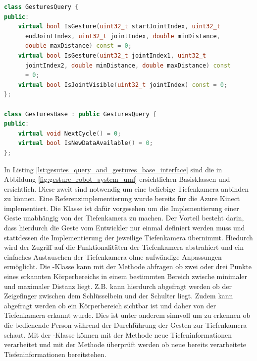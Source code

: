 \begin{lstlisting}[language=C++, caption={\quoteMark{GesturesQuery}- und \quoteMark{GesturesBase}-Programmierschnittstelle zur Anbindung eines Industrieroboters}, label={lst:gesutes_query_and_gestures_base_interface}]
class GesturesQuery {
public:
    virtual bool IsGesture(uint32_t startJointIndex, uint32_t
      endJointIndex, uint32_t jointIndex, double minDistance,
      double maxDistance) const = 0;
    virtual bool IsGesture(uint32_t jointIndex1, uint32_t
      jointIndex2, double minDistance, double maxDistance) const
      = 0;
    virtual bool IsJointVisible(uint32_t jointIndex) const = 0;
};

class GesturesBase : public GesturesQuery {
public:
    virtual void NextCycle() = 0;
    virtual bool IsNewDataAvailable() = 0;
};
\end{lstlisting}\leavevmode\newline\vspace{-1.0em}

In Listing \ref{lst:gesutes_query_and_gestures_base_interface} sind die in Abbildung \ref{fig:gesture_robot_system_uml} ersichtlichen Basisklassen  und  ersichtlich. Diese zweit sind notwendig um eine beliebige Tiefenkamera anbinden zu können. Eine Referenzimplementierung wurde bereits für die Azure Kinect implementiert. Die Klasse  ist dafür vorgesehen um die Implementierung einer Geste unabhängig von der Tiefenkamera zu machen. Der Vorteil besteht darin, dass hierdurch die Geste vom Entwickler nur einmal definiert werden muss und stattdessen die Implementierung der jeweilige Tiefenkamera übernimmt. Hiedurch wird der Zugriff auf die Funktionalitäten der Tiefenkamera abstrahiert und ein einfaches Austauschen der Tiefenkamera ohne aufwändige Anpassungen ermöglicht. Die -Klasse kann mit der Methode  abfragen ob zwei oder drei Punkte eines erkannten Körperbereichs in einem bestimmten Bereich zwische minimaler und maximaler Distanz liegt. Z.B. kann hierdurch abgefragt werden ob der Zeigefinger zwischen dem Schlüsselbein und der Schulter liegt. Zudem kann abgefragt werden ob ein Körperbereich sichtbar ist und daher von der Tiefenkamera erkannt wurde. Dies ist unter anderem sinnvoll um zu erkennen ob die bedienende Person während der Durchführung der Gesten zur Tiefenkamera schaut. Mit der -Klasse können mit der Methode  neue Tiefeninformationen verarbeitet und mit der Methode  überprüft werden ob neue bereits verarbeitete Tiefeninformationen bereitstehen.\\

